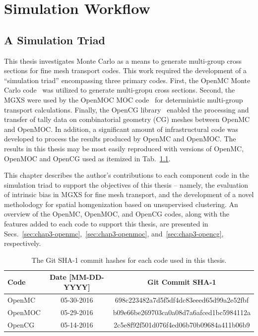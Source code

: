\chapter{Simulation Workflow}
\label{chap:workflow}

\section{A Simulation Triad}
\label{chap3:triad}

This thesis investigates Monte Carlo as a means to generate multi-group cross sections for fine mesh transport codes. This work required the development of a ``simulation triad'' encompassing three primary codes. First, the OpenMC Monte Carlo code~\cite{romano2013openmc} was utilized to generate multi-gropu cross sections. Second, the \ac{MGXS} were used by the OpenMOC \ac{MOC} code~\cite{boyd2014openmoc} for deterministic multi-group transport calculations. Finally, the OpenCG library~\cite{boyd2015opencg} enabled the processing and transfer of tally data on combinatorial geometry (CG) meshes between OpenMC and OpenMOC. In addition, a significant amount of infrastructural code was developed to process the results produced by OpenMC and OpenMOC. The results in this thesis may be most easily reproduced with versions of OpenMC, OpenMOC and OpenCG used as itemized in Tab.~\ref{table:chap4-git-shas}.

This chapter describes the author's contributions to each component code in the simulation triad to support the objectives of this thesis -- namely, the evaluation of intrinsic bias in \ac{MGXS} for fine mesh transport, and the development of a novel metholodogy for spatial homgenization based on unsupervised clustering. An overview of the OpenMC, OpenMOC, and OpenCG codes, along with the features added to each code to support this thesis, are presented in Secs.~\ref{sec:chap3-openmc},~\ref{sec:chap3-openmoc}, and~\ref{sec:chap3-opencg}, respectively.

\begin{table}[h!]
  \centering
  \caption[OpenMC, OpenMOC and OpenCG Git SHA-1 codes]{The Git SHA-1 commit hashes for each code used in this thesis.}
  \small
  \label{table:chap4-git-shas} 
  \vspace{6pt}
  \begin{tabular}{l c c}
  \toprule
  \rowcolor{lightgray}
  {\bf Code} &
  {\bf Date [MM-DD-YYYY]} &
  {\bf Git Commit SHA-1} \\
  \midrule
  OpenMC & 05-30-2016 & 698c223482a7d5f5df4dc83eeed65d99a2e52fbf \\
  OpenMOC & 05-29-2016 & b09e66be269703ca0a08d7a6afced1bc5984112a \\
  OpenCG & 05-14-2016 & 2c5e8f92f501d076f4ed06b70b09684a411b06b9 \\
  \bottomrule
\end{tabular}
\end{table}


